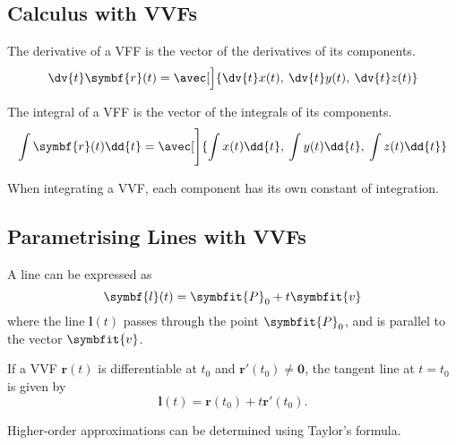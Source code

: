 \documentclass{article}
\begin{document}
\subsection{Calculus with VVFs}
\begin{theorem}
    The derivative of a VFF is the vector of the derivatives of its components.
    \begin{equation*}
        \dv{t}\symbf{r}(t) = \avec[\Big]{\dv{t}x(t),\: \dv{t}y(t),\: \dv{t}z(t)}
    \end{equation*}
\end{theorem}
\begin{theorem}
    The integral of a VFF is the vector of the integrals of its components.
    \begin{equation*}
        \int\symbf{r}(t)\dd{t}
        = \avec[\Bigg]{\int x(t) \dd{t},\: \int y(t) \dd{t},\: \int z(t) \dd{t}}
    \end{equation*}
\end{theorem}
\begin{remark}
    When integrating a VVF, each component has its own constant of integration.
\end{remark}
\subsection{Parametrising Lines with VVFs}
\begin{definition}
    A line can be expressed as
    \begin{equation*}
        \symbf{l}(t) = \symbfit{P}_0 + t\symbfit{v}
    \end{equation*}
    where the line $\symbf{l}(t)$ passes through the point $\symbfit{P}_0$, and is parallel to the vector $\symbfit{v}$.
\end{definition}
\begin{definition}
    If a VVF $\symbf{r}(t)$ is differentiable at
    $t_0$ and $\symbf{r'}(t_0)\ne\symbf{0}$, the tangent line at 
    $t=t_0$ is given by
    \begin{equation*}
        \symbf{l}(t) = \symbf{r}(t_0)+t\symbf{r'}(t_0).
    \end{equation*}
\end{definition}
\begin{remark}
    Higher-order approximations can be determined using Taylor's formula.
\end{remark}
\end{document}
